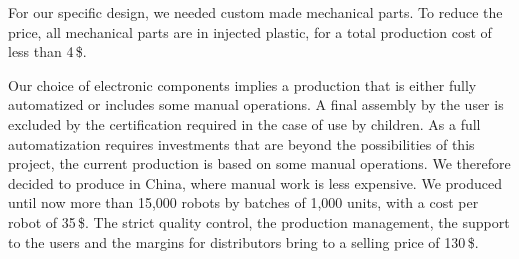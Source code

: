 \documentclass[letterpaper, 10 pt, conference]{ieeeconf}  %
\begin{document}
For our specific design, we needed custom made mechanical parts.
To reduce the price, all mechanical parts are in injected plastic, for a total production cost of less than 4\,\$.

Our choice of electronic components implies a production that is either fully automatized or includes some manual operations. 
A final assembly by the user is excluded by the certification required in the case of use by children. 
As a full automatization requires investments that are beyond the possibilities of this project, the current production is based on some manual operations. 
We therefore decided to produce in China, where manual work is less expensive.
We produced until now more than 15,000 robots by batches of 1,000 units, with a cost per robot of 35\,\$.
The strict quality control, the production management, the support to the users and the margins for distributors bring to a selling price of 130\,\$.

\end{document}
